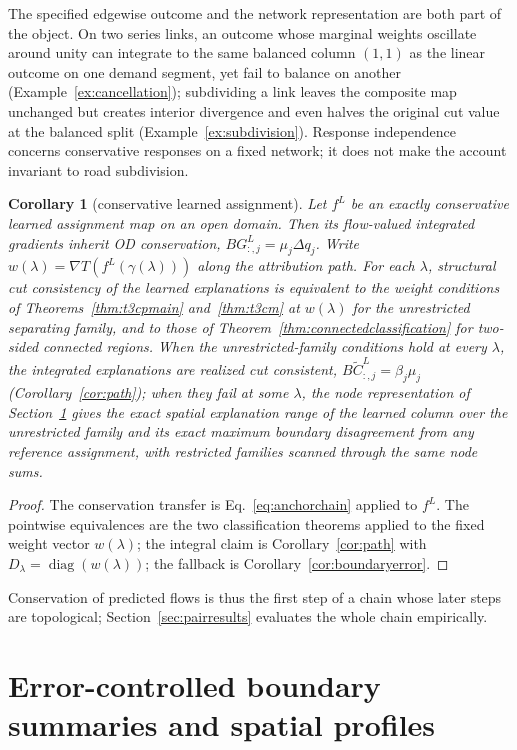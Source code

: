 \documentclass[a4paper,fleqn]{cas-sc}
\newtheorem{corollary}[theorem]{Corollary}
\begin{document}
The specified edgewise outcome and the network representation are both
part of the object. On two series links, an outcome whose marginal
weights oscillate around unity can integrate to the same balanced column
$(1,1)$ as the linear outcome on one demand segment, yet fail to balance
on another (Example~\ref{ex:cancellation}); subdividing a link leaves
the composite map unchanged but creates interior divergence and even
halves the original cut value at the balanced split
(Example~\ref{ex:subdivision}). Response independence concerns
conservative responses on a fixed network; it does not make the account
invariant to road subdivision.

\begin{corollary}[conservative learned assignment]\label{cor:learned}
Let $f^L$ be an exactly conservative learned assignment map on an open
domain. Then its flow-valued integrated gradients inherit OD
conservation, $BG^L_{:,j}=\mu_j\Delta q_j$. Write
$w(\lambda)=\nabla T(f^L(\gamma(\lambda)))$ along the attribution path.
For each $\lambda$, structural cut consistency of the learned
explanations is equivalent to the weight conditions of
Theorems~\ref{thm:t3cpmain} and~\ref{thm:t3cm} at $w(\lambda)$ for the
unrestricted separating family, and to those of
Theorem~\ref{thm:connectedclassification} for two-sided connected
regions. When the unrestricted-family conditions hold at every
$\lambda$, the integrated explanations are realized cut consistent,
$B\widetilde C^{L}_{:,j}=\beta_j\mu_j$
(Corollary~\ref{cor:path}); when they fail at some $\lambda$, the node
representation of Section~\ref{sec:stability} gives the exact spatial
explanation range of the learned column over the unrestricted family
and its exact maximum boundary disagreement from any reference
assignment, with restricted families scanned through the same node
sums.
\end{corollary}
\begin{proof}
The conservation transfer is Eq.~\eqref{eq:anchorchain} applied to
$f^L$. The pointwise equivalences are the two classification theorems
applied to the fixed weight vector $w(\lambda)$; the integral claim is
Corollary~\ref{cor:path} with
$D_\lambda=\operatorname{diag}(w(\lambda))$; the fallback is
Corollary~\ref{cor:boundaryerror}.
\end{proof}
Conservation of predicted flows is thus the first step of a chain whose
later steps are topological; Section~\ref{sec:pairresults} evaluates the
whole chain empirically.

\section{Error-controlled boundary summaries and spatial profiles}\label{sec:stability}\label{sec:algorithm}
\end{document}
